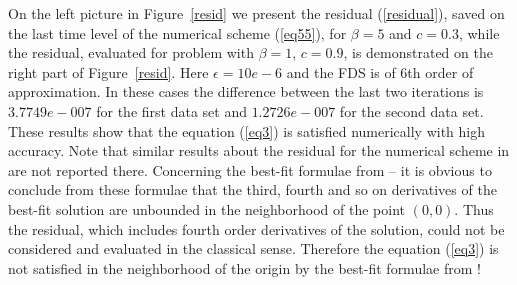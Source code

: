 \documentclass[leqno,11pt]{book}
\newcommand{\rf}[1]{(\ref{#1})}
\begin{document}
On the left picture in Figure~\ref{resid} we present  the residual \rf{residual}, saved on the last time level of the numerical scheme \rf{eq55},  for $\beta = 5$ and $c = 0.3$, while the residual, evaluated for problem with $\beta = 1$, $c = 0.9$, is demonstrated on the right part of Figure~\ref{resid}. Here  $\epsilon =10e-6$ and the FDS is of 6th order of approximation. In these cases the difference between the last two iterations is $3.7749e-007$ for the first data set and $1.2726e-007$ for the second data set. These results show that the  equation \rf{eq3} is satisfied numerically with high accuracy. 
Note that similar results about the residual for the numerical scheme in \cite{Ch2012} are not reported there. Concerning the best-fit formulae from \cite{Ch2011} -- it is obvious to conclude from these formulae that the third, fourth and so on  derivatives of the best-fit solution are unbounded in the neighborhood of the point $(0,0)$. Thus  
the residual, which includes fourth order derivatives of the solution, could not be considered and evaluated in the classical sense. Therefore the equation \rf{eq3} is not satisfied in the neighborhood of the origin by the best-fit formulae  from \cite{Ch2011}!
\end{document}

